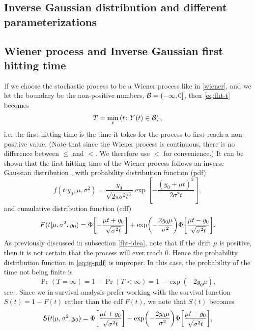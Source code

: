 \subsection{Inverse Gaussian distribution and different parameterizations}


\subsection{Wiener process and Inverse Gaussian first hitting time}
If we choose the stochastic process to be a Wiener process like in \eqref{wiener}, and we let the boundary be the non-positive numbers, $\mathcal{B}=(-\infty,0]$, then \eqref{eq:fht-t} becomes
\begin{equation}
    T=\min_t\left(t\colon Y(t)\in\mathcal{B}\right),
\end{equation}
i.e. the first hitting time is the time it takes for the process to first reach a non-positive value.
(Note that since the Wiener process is continuous, there is no difference between $\leq$ and $<$. We therefore use $<$ for convenience.)
It can be shown that the first hitting time of the Wiener process follows an inverse Gaussian distribution \citep{chhikara1988}, with probability distribution function (pdf)
\begin{equation}
\label{eq:ig-pdf}
    f(t|y_0,\mu,\sigma^2)=\frac{y_0}{\sqrt{2\pi\sigma^2t^3}}\exp\left[-\frac{(y_0+\mu t)^2}{2\sigma^2t}\right],
\end{equation}
and cumulative distribution function (cdf)
\begin{equation}
\label{eq:ig-cdf}
    F(t|\mu,\sigma^2,y_0)=\Phi\sqb*{-\frac{\mu t+y_0}{\sqrt{\sigma^2t}}}+\exp\p*{-\frac{2y_0\mu}{\sigma^2}}\Phi\sqb*{\frac{\mu t-y_0}{\sqrt{\sigma^2t}}}.
\end{equation}
As previously discussed in subsection \ref{fht-idea}, note that if the drift $\mu$ is positive, then it is not certain that the process will ever reach 0. Hence the probability distribution function in \eqref{eq:ig-pdf} is improper. In this case, the probability of the time not being finite is
\begin{equation}\label{eq:P-inf-FHT}
    \Pr{(T=\infty)}=1-\Pr{(T<\infty)}=1-\exp{(-2y_0\mu)},
\end{equation}
see \citet{cox1965}. Since we in survival analysis prefer working with the survival function $S(t)=1-F(t)$ rather than the cdf $F(t)$, we note that $S(t)$ becomes
\begin{equation}
\label{eq:ig-surv}
    S(t|\mu,\sigma^2,y_0)=\Phi\sqb*{\frac{\mu t+y_0}{\sqrt{\sigma^2t}}}-\exp\p*{-\frac{2y_0\mu}{\sigma^2}}\Phi\sqb*{\frac{\mu t-y_0}{\sqrt{\sigma^2t}}},
\end{equation}
